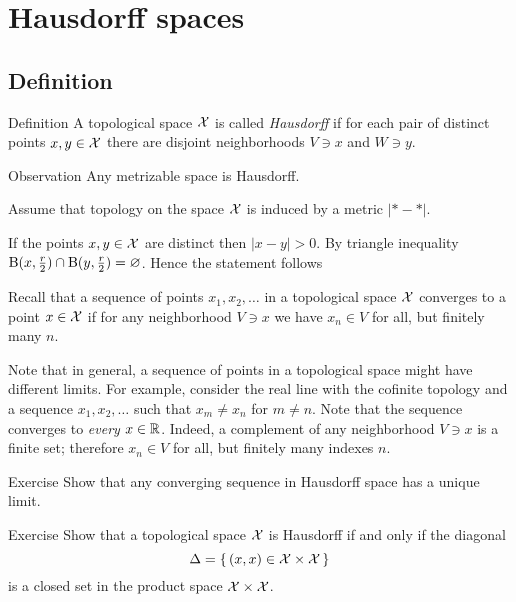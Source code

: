 \chapter{Hausdorff spaces}

\section{Definition}

\begin{thm}{Definition}\label{def:hausdorff}
A topological space $\mathcal{X}$ is called \emph{Hausdorff} if for each pair of distinct points
$x, y \in \mathcal{X}$ there are disjoint neighborhoods $V\ni x$ and $W\ni y$.
\end{thm}

\begin{thm}{Observation}
Any metrizable space is Hausdorff.
\end{thm}

Assume that topology on the space $\mathcal{X}$ is induced by a metric $|{*}-{*}|$.

If the points $x,y\in\mathcal{X}$ are distinct then $|x-y|>0$.
By triangle inequality 
$\mathrm{B}(x,\tfrac r2)\cap \mathrm{B}(y,\tfrac r2)=\varnothing$.
Hence the statement follows
\qeds

Recall that a sequence of points $x_1,x_2,\dots$ in a topological space $\mathcal{X}$ converges to a point $x\in  \mathcal{X}$
if for any neighborhood $V\ni x$ we have 
$x_n\in V$ for all, but finitely many $n$.

Note that in general, a sequence of points in a topological space might have different limits.
For example, consider the real line with the cofinite topology and a sequence $x_1,x_2,\dots$ such that $x_m\ne x_n$ for $m\ne n$.
Note that the sequence converges to \textit{every} $x\in \mathbb{R}$.
Indeed, a complement of any neighborhood $V\ni x$ is a finite set;
therefore $x_n\in V$ for all, but finitely many indexes $n$.

\begin{thm}{Exercise}\label{ex:hausdorff-unique-limit}
Show that any converging sequence in Hausdorff space has a unique limit.
\end{thm}


\begin{thm}{Exercise}\label{ex:hausdorff-diagonal}
Show that a topological space $\mathcal{X}$ is Hausdorff
if and only if the diagonal 
\[\Delta=\{\,(x,x)\in \mathcal{X}\times\mathcal{X}\,\}\]
is a closed set in the product space $\mathcal{X}\times\mathcal{X}$.
\end{thm}

